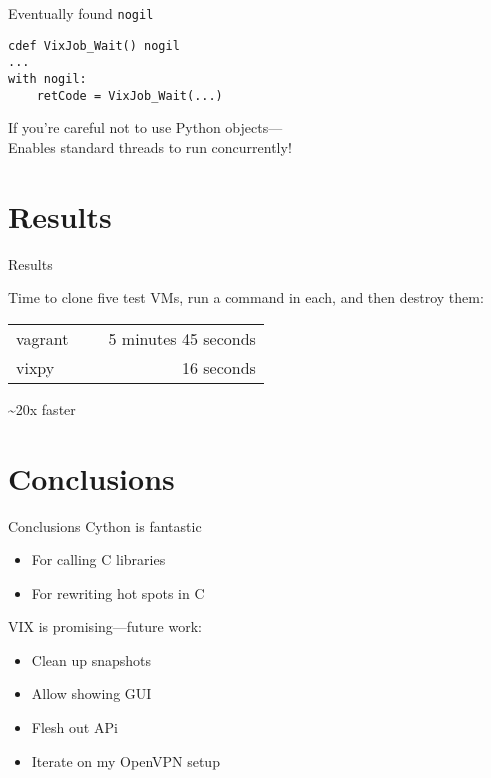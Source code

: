 \documentclass[xcolor=svgnames,17pt]{beamer}
\begin{document}
\begin{frame}[fragile]{Eventually found \texttt{nogil}}

\begin{verbatim}
cdef VixJob_Wait() nogil
...
with nogil:
    retCode = VixJob_Wait(...)
\end{verbatim}

If you’re careful not to use Python objects— \\[0.5\baselineskip]
Enables standard threads to run concurrently!

\end{frame}

\section{Results}

\begin{frame}{Results}

Time to clone five test VMs, run a command in each, and then destroy them:

\pause
\vspace*{1.5\baselineskip}

\centering
\begin{tabular}{lr}
vagrant\ \ \  & 5 minutes 45 seconds \\
\pause
vixpy & 16 seconds
\end{tabular}
\vspace*{1.5\baselineskip}

\pause

\textasciitilde20x faster

\end{frame}

\section{Conclusions}

\begin{frame}{Conclusions}
Cython is fantastic
\begin{itemize}
\item For calling C libraries
\item For rewriting hot spots in C
\end{itemize}
\pause
VIX is promising\pause{}—future work:
\begin{itemize}
\item Clean up snapshots
\pause
\item Allow showing GUI
\pause
\item Flesh out APi
\pause
\item Iterate on my OpenVPN setup
\end{itemize}
\end{frame}
\end{document}
